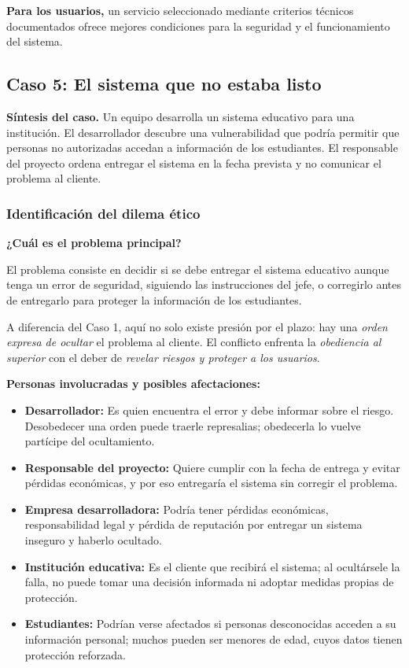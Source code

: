 \documentclass[12pt,a4paper,oneside]{article}
\newcommand{\rotulo}[1]{\par\Needspace{5\baselineskip}\noindent\textbf{#1}\par\nobreak}
\begin{document}
\textbf{Para los usuarios,} un servicio seleccionado mediante criterios técnicos documentados ofrece mejores condiciones para la seguridad y el funcionamiento del sistema.


\subsection{Caso 5: El sistema que no estaba listo}

\textbf{Síntesis del caso.} Un equipo desarrolla un sistema educativo para una institución. El desarrollador descubre una vulnerabilidad que podría permitir que personas no autorizadas accedan a información de los estudiantes. El responsable del proyecto ordena entregar el sistema en la fecha prevista y no comunicar el problema al cliente.

\subsubsection{Identificación del dilema ético}

\rotulo{¿Cuál es el problema principal?}

El problema consiste en decidir si se debe entregar el sistema educativo aunque tenga un error de seguridad, siguiendo las instrucciones del jefe, o corregirlo antes de entregarlo para proteger la información de los estudiantes.

A diferencia del Caso 1, aquí no solo existe presión por el plazo: hay una \emph{orden expresa de ocultar} el problema al cliente. El conflicto enfrenta la \emph{obediencia al superior} con el deber de \emph{revelar riesgos y proteger a los usuarios}.

\rotulo{Personas involucradas y posibles afectaciones:}

\begin{itemize}[leftmargin=1.8em,itemsep=3pt]
    \item \textbf{Desarrollador:} Es quien encuentra el error y debe informar sobre el riesgo. Desobedecer una orden puede traerle represalias; obedecerla lo vuelve partícipe del ocultamiento.
    \item \textbf{Responsable del proyecto:} Quiere cumplir con la fecha de entrega y evitar pérdidas económicas, y por eso entregaría el sistema sin corregir el problema.
    \item \textbf{Empresa desarrolladora:} Podría tener pérdidas económicas, responsabilidad legal y pérdida de reputación por entregar un sistema inseguro y haberlo ocultado.
    \item \textbf{Institución educativa:} Es el cliente que recibirá el sistema; al ocultársele la falla, no puede tomar una decisión informada ni adoptar medidas propias de protección.
    \item \textbf{Estudiantes:} Podrían verse afectados si personas desconocidas acceden a su información personal; muchos pueden ser menores de edad, cuyos datos tienen protección reforzada.
\end{itemize}
\end{document}
